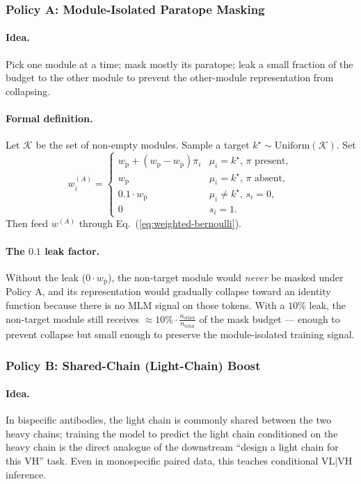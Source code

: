 \documentclass[11pt]{article}
\begin{document}
\subsubsection{Policy A: Module-Isolated Paratope Masking}
\paragraph{Idea.} Pick one module at a time; mask mostly its paratope;
leak a small fraction of the budget to the other module to prevent
the other-module representation from collapsing.

\paragraph{Formal definition.} Let $\mathcal{K}$ be the set of
non-empty modules. Sample a target $k^{\star} \sim \text{Uniform}(\mathcal{K})$.
Set
\begin{equation}
w^{(A)}_i =
\begin{cases}
w_{\bar{\text{p}}} + (w_{\text{p}} - w_{\bar{\text{p}}}) \pi_i & \mu_i = k^{\star},\, \pi \text{ present}, \\
w_{\text{p}} & \mu_i = k^{\star},\, \pi \text{ absent}, \\
0.1 \cdot w_{\bar{\text{p}}} & \mu_i \neq k^{\star},\, s_i = 0, \\
0 & s_i = 1.
\end{cases}
\end{equation}
Then feed $w^{(A)}$ through Eq.~(\ref{eq:weighted-bernoulli}).

\paragraph{The $0.1$ leak factor.} Without the leak ($0 \cdot w_{\bar{\text{p}}}$),
the non-target module would \emph{never} be masked under Policy A, and
its representation would gradually collapse toward an identity function
because there is no MLM signal on those tokens. With a $10\%$ leak, the
non-target module still receives $\approx 10\% \cdot \tfrac{n_{\text{other}}}{n_{\text{total}}}$
of the mask budget --- enough to prevent collapse but small enough to
preserve the module-isolated training signal.

\subsubsection{Policy B: Shared-Chain (Light-Chain) Boost}
\paragraph{Idea.} In bispecific antibodies, the light chain is commonly
shared between the two heavy chains; training the model to predict the
light chain conditioned on the heavy chain is the direct analogue of the
downstream ``design a light chain for this VH'' task. Even in
monospecific paired data, this teaches conditional VL$\mid$VH
inference.
\end{document}
